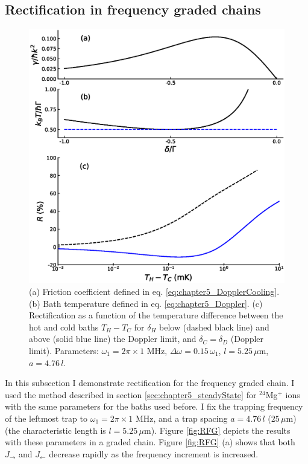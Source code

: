 \subsection{Rectification in frequency graded chains \label{GradedChains}}
%
%
\begin{figure}
  \center
  \includegraphics[width=0.75\linewidth]{Figures/R_as_function_of_TemperatureBias.eps}
  \caption{ (a) Friction coefficient defined in eq. \eqref{eq:chapter5_DopplerCooling}. (b) Bath temperature defined in eq. \eqref{eq:chapter5_Doppler}. (c) Rectification as a function of the temperature difference between the hot and cold baths $T_H -T_C$ for $\delta_H$ below (dashed black line) and above (solid blue line) the Doppler limit, and $\delta_C=\delta_D$ (Doppler limit). Parameters: $\omega_1 = 2 \pi \times 1$ MHz, $\Delta \omega = 0.15 \, \omega_1$, $l = 5.25\,\mu$m, $a = 4.76 \, l$.}
  \label{fig:RD}
\end{figure}
%
In this subsection I demonstrate rectification for the frequency graded chain. I  used the method described in section \ref{sec:chapter5_steadyState} for $^{24}$Mg$^+$ ions with the same parameters for the baths used before. I fix the trapping frequency of the leftmost trap to $\omega_1 = 2\pi \times 1$ MHz, and a trap spacing $a = 4.76\, l$ ($25\,\mu$m) (the  characteristic length is $l = 5.25\,\mu$m). Figure \ref{fig:RFG} depicts  the results with these parameters in a graded chain. Figure \ref{fig:RFG} (a) shows that both
$J_\rightarrow$ and $J_\leftarrow$
decrease rapidly as the frequency increment  is increased.
